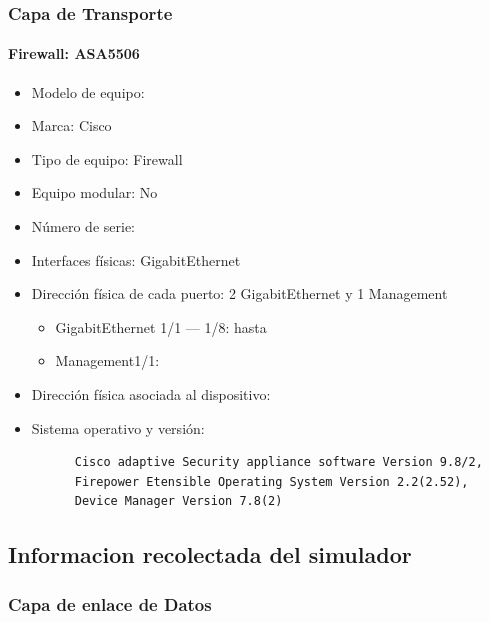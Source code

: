\subsubsection*{Capa de Transporte}

\paragraph{Firewall: ASA5506}
\begin{itemize}
  \item Modelo de equipo: 
  \item Marca: Cisco
  \item Tipo de equipo: Firewall
  \item Equipo modular: No
  \item Número de serie: 
  \item Interfaces físicas: GigabitEthernet
  \item Dirección física de cada puerto: 2 GigabitEthernet y 1 Management
  \begin{itemize}
    \item GigabitEthernet 1/1 — 1/8:  hasta 
    \item Management1/1: 
  \end{itemize}

  \item Dirección física asociada al dispositivo: 
  \item Sistema operativo y versión:
    \begin{verbatim}
      Cisco adaptive Security appliance software Version 9.8/2,
      Firepower Etensible Operating System Version 2.2(2.52), 
      Device Manager Version 7.8(2)
    \end{verbatim}
\end{itemize}

\subsection{Informacion recolectada del simulador}

\subsubsection*{Capa de enlace de Datos}


